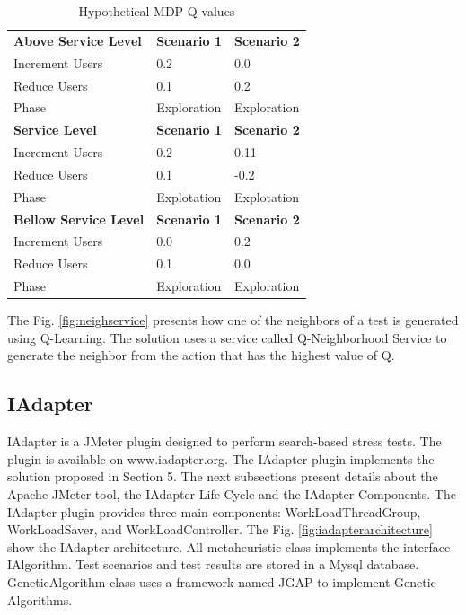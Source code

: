 \begin{table}[]
\centering
\caption{Hypothetical MDP Q-values }
\label{pab:mdp}
\begin{tabular}{lll}
\rowcolor[HTML]{C0C0C0} 
\textbf{Above Service Level}  & \textbf{Scenario 1} & \textbf{Scenario 2} \\
Increment Users               & 0.2                 & 0.0                 \\
Reduce Users                  & 0.1                 & 0.2                 \\
Phase                         & Exploration         & Exploration         \\
\rowcolor[HTML]{C0C0C0} 
\textbf{Service Level}        & \textbf{Scenario 1} & \textbf{Scenario 2} \\
Increment Users               & 0.2                 & 0.11                \\
Reduce Users                  & 0.1                 & -0.2                \\
\rowcolor[HTML]{F8FF00} 
Phase                         & Explotation         & Explotation         \\
\rowcolor[HTML]{C0C0C0} 
\textbf{Bellow Service Level} & \textbf{Scenario 1} & \textbf{Scenario 2} \\
Increment Users               & 0.0                 & 0.2                 \\
Reduce Users                  & 0.1                 & 0.0                 \\
Phase                         & Exploration         & Exploration        
\end{tabular}
\end{table}

The Fig. \ref{fig:neighservice} presents how one of the neighbors of a test is generated using Q-Learning. The solution uses a service called Q-Neighborhood Service to generate the neighbor from the action that has the highest value of Q.




\subsection{IAdapter}

IAdapter is a JMeter plugin designed to perform search-based stress tests.  The plugin is available on www.iadapter.org.  The IAdapter plugin implements the solution proposed in Section 5. The next subsections present details about the Apache JMeter tool, the IAdapter Life Cycle and the IAdapter Components. The IAdapter plugin provides three main components: WorkLoadThreadGroup, WorkLoadSaver, and WorkLoadController. The Fig. \ref{fig:iadapterarchitecture} show the IAdapter architecture. All metaheuristic class implements the interface IAlgorithm. Test scenarios  and test results are stored in a Mysql database. GeneticAlgorithm class uses a framework named JGAP to implement Genetic Algorithms.

